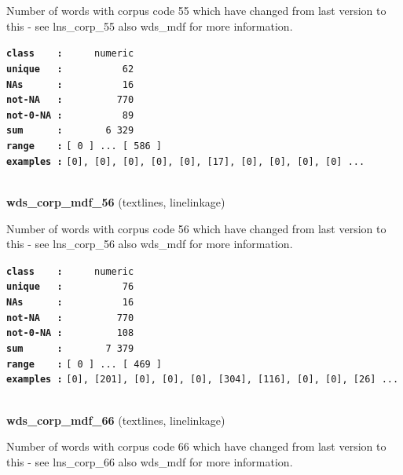 \documentclass[]{article}
\begin{document}
Number of words with corpus code 55 which have changed from last version
to this - see lns\_corp\_55 also wds\_mdf for more information.

\textbf{\texttt{class\ \ \ \ :}} \texttt{~~~~~numeric}\\
\textbf{\texttt{unique\ \ \ :}} \texttt{~~~~~~~~~~62}\\
\textbf{\texttt{NAs\ \ \ \ \ \ :}} \texttt{~~~~~~~~~~16}\\
\textbf{\texttt{not-NA\ \ \ :}} \texttt{~~~~~~~~~770}\\
\textbf{\texttt{not-0-NA\ :}} \texttt{~~~~~~~~~~89}\\
\textbf{\texttt{sum\ \ \ \ \ \ :}} \texttt{~~~~~~~6~329}\\
\textbf{\texttt{range\ \ \ \ :}}
\texttt{{[}\ 0\ {]}\ ...\ {[}\ 586\ {]}}\\
\textbf{\texttt{examples\ :}}
\texttt{{[}0{]},\ {[}0{]},\ {[}0{]},\ {[}0{]},\ {[}0{]},\ {[}17{]},\ {[}0{]},\ {[}0{]},\ {[}0{]},\ {[}0{]}\ ...}\\

~

\textbf{wds\_corp\_mdf\_56} (textlines, linelinkage)

Number of words with corpus code 56 which have changed from last version
to this - see lns\_corp\_56 also wds\_mdf for more information.

\textbf{\texttt{class\ \ \ \ :}} \texttt{~~~~~numeric}\\
\textbf{\texttt{unique\ \ \ :}} \texttt{~~~~~~~~~~76}\\
\textbf{\texttt{NAs\ \ \ \ \ \ :}} \texttt{~~~~~~~~~~16}\\
\textbf{\texttt{not-NA\ \ \ :}} \texttt{~~~~~~~~~770}\\
\textbf{\texttt{not-0-NA\ :}} \texttt{~~~~~~~~~108}\\
\textbf{\texttt{sum\ \ \ \ \ \ :}} \texttt{~~~~~~~7~379}\\
\textbf{\texttt{range\ \ \ \ :}}
\texttt{{[}\ 0\ {]}\ ...\ {[}\ 469\ {]}}\\
\textbf{\texttt{examples\ :}}
\texttt{{[}0{]},\ {[}201{]},\ {[}0{]},\ {[}0{]},\ {[}0{]},\ {[}304{]},\ {[}116{]},\ {[}0{]},\ {[}0{]},\ {[}26{]}\ ...}\\

~

\textbf{wds\_corp\_mdf\_66} (textlines, linelinkage)

Number of words with corpus code 66 which have changed from last version
to this - see lns\_corp\_66 also wds\_mdf for more information.
\end{document}
